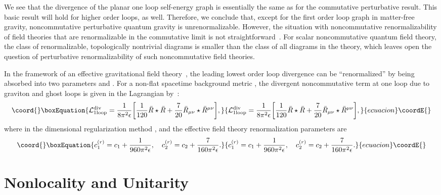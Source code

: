 \documentclass[a4paper,10pt]{article}
\begin{document}
We see that the divergence of the planar one loop self-energy graph is
essentially the same as for the commutative perturbative result.
This basic result will hold for higher order loops, as well. Therefore, we
conclude that, except for the first order loop graph in matter-free
gravity, noncommutative perturbative quantum gravity is unrenormalizable.
However, the situation with noncommutative renormalizability of field theories that
are renormalizable in the \coordHE{} commutative limit is not
straightforward~\cite{Chepelev,Minwalla}. For scalar noncommutative
quantum field theory, the class of renormalizable, topologically nontrivial
diagrams is smaller than the class of all diagrams in the theory, which
leaves open the question of perturbative renormalizability of such
noncommutative field theories.

In the framework of an effective gravitational field
theory~\cite{Donoghue}, the leading lowest order loop divergence can be
``renormalized'' by being absorbed into two parameters \coordHE{} and \coordHE{}. For
a non-flat spacetime background metric \coordHE{}, the divergent
noncommutative term at one loop due to graviton and ghost loops is given in the
Lagrangian by~\cite{Veltman}:
\begin{equation}\coord{}\boxEquation{
{\cal L}^{\rm div}_{1{\rm
loop}}=\frac{1}{8\pi^2\epsilon} \biggl[\frac{1}{120}{\bar R}\star{\bar
R}+\frac{7}{20}{\bar R}_{\mu\nu} \star{\bar R}^{\mu\nu}\biggr], }{
{\cal L}^{\rm div}_{1{\rm
loop}}=\frac{1}{8\pi^2\epsilon} \biggl[\frac{1}{120}{\bar R}\star{\bar
R}+\frac{7}{20}{\bar R}_{\mu\nu} \star{\bar R}^{\mu\nu}\biggr], }{ecuacion}\coordE{}\end{equation} where
in the dimensional regularization method \coordHE{}, and the effective 
field theory renormalization parameters are
\begin{equation}\coord{}\boxEquation{
c^{(r)}_1=c_1+\frac{1}{960\pi^2\epsilon},\quad
c^{(r)}_2=c_2+\frac{7}{160\pi^2\epsilon}.
}{
c^{(r)}_1=c_1+\frac{1}{960\pi^2\epsilon},\quad
c^{(r)}_2=c_2+\frac{7}{160\pi^2\epsilon}.
}{ecuacion}\coordE{}\end{equation}
 
\section{Nonlocality and Unitarity}
\end{document}
